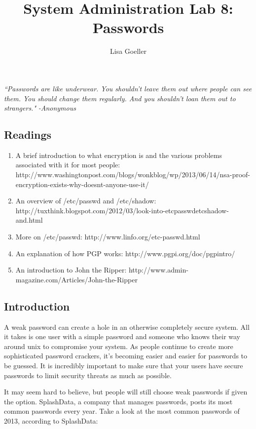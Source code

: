 \documentclass[11pt,a4paper]{article}
\title{System Administration Lab 8: Passwords\vspace{-2ex}}
\author{Lisa Goeller}
\date{}
\begin{document}
\maketitle

\emph{``Passwords are like underwear. You shouldn’t leave them out where people can see them. You should change them regularly. And you shouldn’t loan them out to strangers."}
\newline
\null\hfill\hfill\emph{-Anonymous}

\subsection*{Readings}

\begin{enumerate}
\item A brief introduction to what encryption is and the various problems associated with it for most people: http://www.washingtonpost.com/blogs/wonkblog/wp/2013/06/14/nsa-proof-encryption-exists-why-doesnt-anyone-use-it/

\item An overview of /etc/passwd and /etc/shadow: http://tuxthink.blogspot.com/2012/03/look-into-etcpasswdetcshadow-and.html
\item More on /etc/passwd: http://www.linfo.org/etc-passwd.html
\item An explanation of how PGP works: http://www.pgpi.org/doc/pgpintro/
\item An introduction to John the Ripper: http://www.admin-magazine.com/Articles/John-the-Ripper

\end{enumerate}

\subsection*{Introduction}

\indent\indent A weak password can create a hole in an otherwise completely secure system.  All it takes is one user with a simple password and someone who knows their way around unix to compromise your system. As people continue to create more sophisticated password crackers, it's becoming easier and easier for  passwords to be guessed. It is incredibly important to make sure that your users have secure passwords to limit security threats as much as possible.

It may seem hard to believe, but people will still choose weak passwords if given the option. SplashData, a company that manages passwords, posts its most common passwords every year. Take a look at the most common passwords of 2013, according to SplashData:
\end{document}
